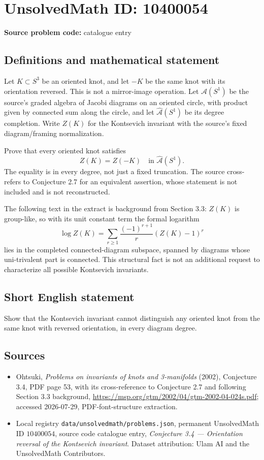 \documentclass[11pt]{article}
\begin{document}
\section*{UnsolvedMath ID: 10400054}
\textbf{Source problem code:} catalogue entry
\subsection{Definitions and mathematical statement}
Let $K\subset S^3$ be an oriented knot, and let $-K$ be the same knot with its orientation reversed. This is not a mirror-image operation. Let $\mathcal A(S^1)$ be the source's graded algebra of Jacobi diagrams on an oriented circle, with product given by connected sum along the circle, and let $\widehat{\mathcal A}(S^1)$ be its degree completion. Write $Z(K)$ for the Kontsevich invariant with the source's fixed diagram/framing normalization.

Prove that every oriented knot satisfies
\[
Z(K)=Z(-K)\quad\text{in }\widehat{\mathcal A}(S^1).
\]
The equality is in every degree, not just a fixed truncation. The source cross-refers to Conjecture 2.7 for an equivalent assertion, whose statement is not included and is not reconstructed.

The following text in the extract is background from Section 3.3: $Z(K)$ is group-like, so with its unit constant term the formal logarithm
\[
\log Z(K)=\sum_{r\geq1}\frac{(-1)^{r+1}}r(Z(K)-1)^r
\]
lies in the completed connected-diagram subspace, spanned by diagrams whose uni-trivalent part is connected. This structural fact is not an additional request to characterize all possible Kontsevich invariants.
\subsection{Short English statement}
Show that the Kontsevich invariant cannot distinguish any oriented knot from the same knot with reversed orientation, in every diagram degree.
\subsection{Sources}
\begin{itemize}
\item Ohtsuki, \emph{Problems on invariants of knots and 3-manifolds} (2002), Conjecture 3.4, PDF page 53, with its cross-reference to Conjecture 2.7 and following Section 3.3 background, \url{https://msp.org/gtm/2002/04/gtm-2002-04-024s.pdf}; accessed 2026-07-29, PDF-font-structure extraction.
\item Local registry \texttt{data/unsolvedmath/problems.json}, permanent UnsolvedMath ID $10400054$, source code catalogue entry, \emph{Conjecture 3.4 --- Orientation reversal of the Kontsevich invariant}. Dataset attribution: Ulam AI and the UnsolvedMath Contributors.
\end{itemize}
\end{document}
